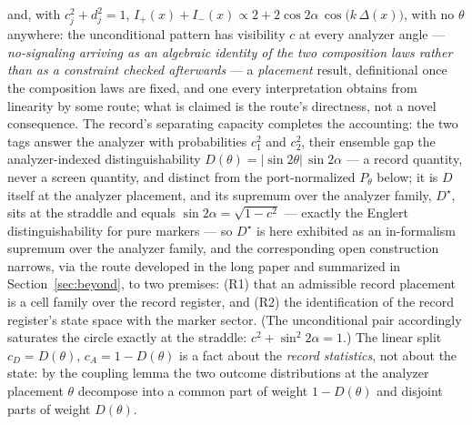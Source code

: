 and, with $c_j^{2} + d_j^{2} = 1$, $I_{+}(x) + I_{-}(x) \propto 2 + 2\cos 2\alpha\, \cos\!\big(k\,\Delta(x)\big)$, with no $\theta$ anywhere: the unconditional pattern has visibility $c$ at every analyzer angle --- \emph{no-signaling arriving as an algebraic identity of the two composition laws rather than as a constraint checked afterwards} --- a \emph{placement} result, definitional once the composition laws are fixed, and one every interpretation obtains from linearity by some route; what is claimed is the route's directness, not a novel consequence. The record's separating capacity completes the accounting: the two tags answer the analyzer with probabilities $c_1^2$ and $c_2^2$, their ensemble gap the analyzer-indexed distinguishability $D(\theta) = |\sin 2\theta|\,\sin 2\alpha$ --- a record quantity, never a screen quantity, and distinct from the port-normalized $P_\theta$ below; it is $D$ itself at the analyzer placement, and its supremum over the analyzer family, $D^{\star}$, sits at the straddle and equals $\sin 2\alpha = \sqrt{1 - c^{2}}$ --- exactly the Englert distinguishability for pure markers --- so $D^{\star}$ is here exhibited as an in-formalism supremum over the analyzer family, and the corresponding open construction narrows, via the route developed in the long paper \cite{Aethus} and summarized in Section~\ref{sec:beyond}, to two premises: (R1) that an admissible record placement is a cell family over the record register, and (R2) the identification of the record register's state space with the marker sector. (The unconditional pair accordingly saturates the circle exactly at the straddle: $c^{2} + \sin^{2} 2\alpha = 1$.) The linear split $c_D = D(\theta)$, $c_A = 1 - D(\theta)$ is a fact about the \emph{record statistics}, not about the state: by the coupling lemma the two outcome distributions at the analyzer placement $\theta$ decompose into a common part of weight $1 - D(\theta)$ and disjoint parts of weight $D(\theta)$.

